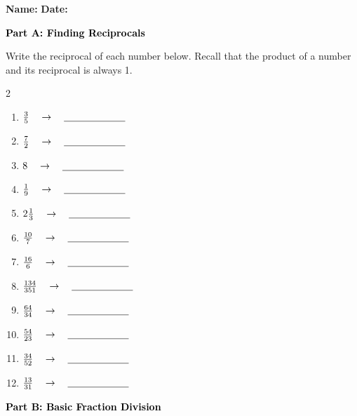 \documentclass[12pt, letterpaper, fleqn]{article}
\newcommand{\blank}{\underline{\hspace{2.2cm}}}
\begin{document}
\textbf{Name:} \underline{\hspace{5cm}}
\hfill
\textbf{Date:} \underline{\hspace{3cm}}\\

\begin{tcolorbox}[colback=black!10]
    \large\textcolor{black}{\textbf{Part A: Finding Reciprocals}}
\end{tcolorbox}

\vspace{3mm}
\noindent
Write the reciprocal of each number below. Recall that the product of a number and its reciprocal is always 1.

\vspace{5mm}
\begin{multicols}{2}
\begin{enumerate}[itemsep=2cm, leftmargin=0.6cm]
\item $\frac{3}{5} \quad \rightarrow \quad \blank$
\item $\frac{7}{2} \quad \rightarrow \quad \blank$
\item $8 \quad \rightarrow \quad \blank$
\item $\frac{1}{9} \quad \rightarrow \quad \blank$
\item $2\frac{1}{3} \quad \rightarrow \quad \blank$
\item $\frac{10}{7} \quad \rightarrow \quad \blank$
\item $\frac{16}{6} \quad \rightarrow \quad \blank$
\item $\frac{134}{351} \quad \rightarrow \quad \blank$
\item $\frac{64}{34} \quad \rightarrow \quad \blank$
\item $\frac{54}{23} \quad \rightarrow \quad \blank$
\item $\frac{34}{52} \quad \rightarrow \quad \blank$
\item $\frac{13}{31} \quad \rightarrow \quad \blank$

\end{enumerate}
\end{multicols}
\newpage

\begin{tcolorbox}[colback=black!10]
    \large\textcolor{black}{\textbf{Part B: Basic Fraction Division}}
\end{tcolorbox}
\end{document}
